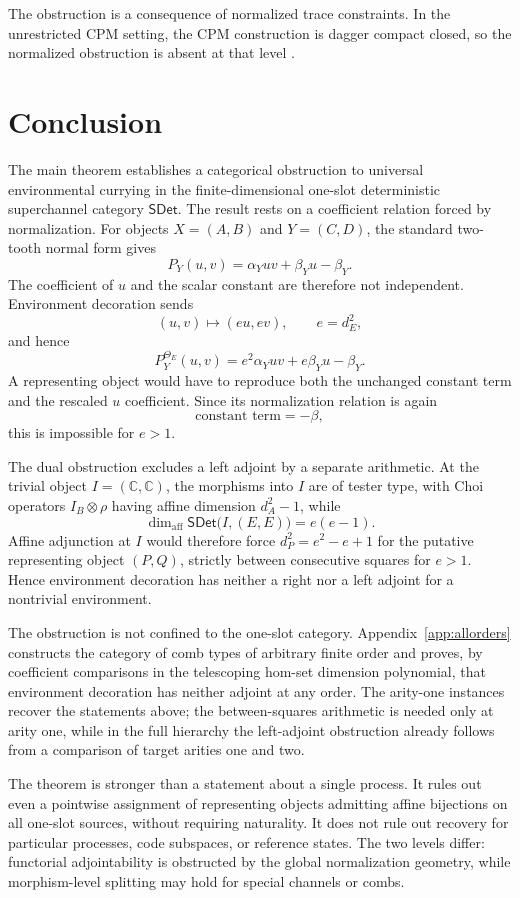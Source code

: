 \documentclass[11pt,a4paper]{article}
\theoremstyle{definition}
\theoremstyle{plain}
\theoremstyle{remark}
\newcommand{\affdim}{\dim_{\mathrm{aff}}}
\newcommand{\SDet}{\mathsf{SDet}}
\begin{document}
The obstruction is a consequence of normalized trace constraints. In the unrestricted CPM setting, the CPM construction is dagger compact closed, so the normalized obstruction is absent at that level \cite{selinger2007}.

\section{Conclusion}

The main theorem establishes a categorical obstruction to universal
environmental currying in the finite-dimensional one-slot deterministic
superchannel category $\SDet$. The result rests on a coefficient relation
forced by normalization. For objects $X=(A,B)$ and $Y=(C,D)$, the standard two-tooth
normal form gives
\[
P_Y(u,v)=\alpha_Yuv+\beta_Yu-\beta_Y.
\]
The coefficient of $u$ and the scalar constant are therefore not
independent. Environment decoration sends
\[
(u,v)\longmapsto(eu,ev),\qquad e=d_E^2,
\]
and hence
\[
P_Y^{\Theta_E}(u,v)=e^2\alpha_Yuv+e\beta_Yu-\beta_Y.
\]
A representing object would have to reproduce both the unchanged
constant term and the rescaled $u$ coefficient. Since its normalization relation is again
\[
\text{constant term}=-\beta,
\]
this is impossible for $e>1$.

The dual obstruction excludes a left adjoint by a separate arithmetic.
At the trivial object $I=(\mathbb C,\mathbb C)$, the morphisms into $I$
are of tester type, with Choi operators $I_B\otimes\rho$ having affine
dimension $d_A^2-1$, while
\[
\affdim\SDet\bigl(I,(E,E)\bigr)=e(e-1).
\]
Affine adjunction at $I$ would therefore force $d_P^2=e^2-e+1$ for the
putative representing object $(P,Q)$, strictly between consecutive
squares for $e>1$. Hence environment decoration has neither a right nor
a left adjoint for a nontrivial environment.

The obstruction is not confined to the one-slot category.
Appendix~\ref{app:allorders} constructs the category of comb types of
arbitrary finite order and proves, by coefficient comparisons in the
telescoping hom-set dimension polynomial, that environment decoration
has neither adjoint at any order. The arity-one instances recover the
statements above; the between-squares arithmetic is needed only at
arity one, while in the full hierarchy the left-adjoint obstruction
already follows from a comparison of target arities one and two.

The theorem is stronger than a statement about a single process. It
rules out even a pointwise assignment of representing objects admitting
affine bijections on all one-slot sources, without requiring naturality.
It does not rule out recovery for particular processes, code subspaces,
or reference states. The two levels differ: functorial adjointability is obstructed by
the global normalization geometry, while morphism-level splitting may hold for
special channels or combs.
\end{document}
